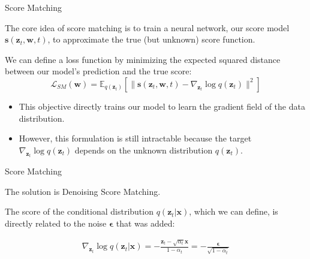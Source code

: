 \documentclass[aspectratio=169,xcolor=dvipsnames]{beamer}
\theoremstyle{named}
\begin{document}

\begin{frame}{Score Matching}

The core idea of score matching is to train a neural network, our \alert{score model} $\mathbf{s}(\mathbf{z}_t, \mathbf{w}, t)$, to approximate the true (but unknown) score function.

\vspace{1em}

We can define a loss function by \alert{minimizing the expected squared distance} between our model's prediction and the true score:
\begin{equation}
    \mathcal{L}_{SM}(\mathbf{w}) = \mathbb{E}_{q(\mathbf{z}_t)} \left[ \| \mathbf{s}(\mathbf{z}_t, \mathbf{w}, t) - \nabla_{\mathbf{z}_t} \log q(\mathbf{z}_t) \|^2 \right]
\end{equation}

\vspace{1em}

\begin{itemize}
    \item This objective directly trains our model to learn the gradient field of the data distribution.
    \item However, this formulation is \alert{still intractable} because the target $\nabla_{\mathbf{z}_t} \log q(\mathbf{z}_t)$ depends on the unknown distribution $q(\mathbf{z}_t)$.
\end{itemize}

\end{frame}


\begin{frame}{Score Matching}

The solution is \alert{Denoising Score Matching}.

\vspace{1em}

The score of the conditional distribution $q(\mathbf{z}_t|\mathbf{x})$, which we can define, is directly related to the noise $\boldsymbol{\epsilon}$ that was added:

\begin{align*}
    \nabla_{\mathbf{z}_t} \log q(\mathbf{z}_t | \mathbf{x}) = -\frac{\mathbf{z}_t - \sqrt{\alpha_t}\mathbf{x}}{1-\alpha_t} = -\frac{\boldsymbol{\epsilon}}{\sqrt{1-\alpha_t}}
\end{align*}

\end{frame}
\end{document}

